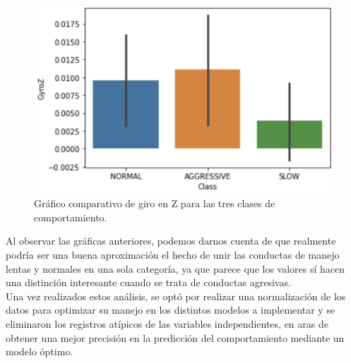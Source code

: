 \documentclass[spanish,12pt,letterpaper]{article}
\begin{document}
    \begin{figure}[H]
        \centering
        \includegraphics[width=1\columnwidth]{GyroZ.png}
        \caption{Gráfico comparativo de giro en Z para las tres clases de comportamiento.}
        \label{fig:comand}%
    \end{figure}

\textsc Al observar las gráficas anteriores, podemos darnos cuenta de que realmente podría ser una buena aproximación el hecho de unir las conductas de manejo lentas y normales en una sola categoría, ya que parece que los valores sí hacen una distinción interesante cuando se trata de conductas agresivas. \\

\textsc Una vez realizados estos análisis, se optó por realizar una normalización de los datos para optimizar su manejo en los distintos modelos a implementar y se eliminaron los registros atípicos de las variables independientes, en aras de obtener una mejor precisión en la predicción del comportamiento mediante un modelo óptimo.
\end{document}
